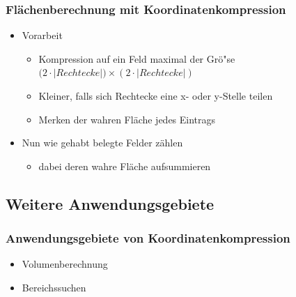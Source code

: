 \begin{frame}
	\frametitle{{Fl\"achenberechnung mit Koordinatenkompression}}
		\pause
	\begin{itemize}
		\item Vorarbeit
		\pause
		\begin{itemize}
			\item Kompression auf ein Feld maximal der Gr\"o"se $\mathcal (2 \cdot \left|Rechtecke\right|)\times(2 \cdot \left|Rechtecke\right|)$
			\pause
			\item Kleiner, falls sich Rechtecke eine x- oder y-Stelle teilen
			\pause
			\item Merken der wahren Fl\"ache jedes Eintrags
		\end{itemize}
		\pause
		\item Nun wie gehabt belegte Felder z\"ahlen
			\pause
		\begin{itemize}
			\item dabei deren wahre Fl\"ache aufsummieren
		\end{itemize}
	\end{itemize}
\end{frame}

\subsection{Weitere Anwendungsgebiete}
\begin{frame}
	\frametitle{{Anwendungsgebiete von Koordinatenkompression}}
	\begin{itemize}
		\item Volumenberechnung
		\pause
		\item Bereichssuchen
	\end{itemize}
\end{frame}